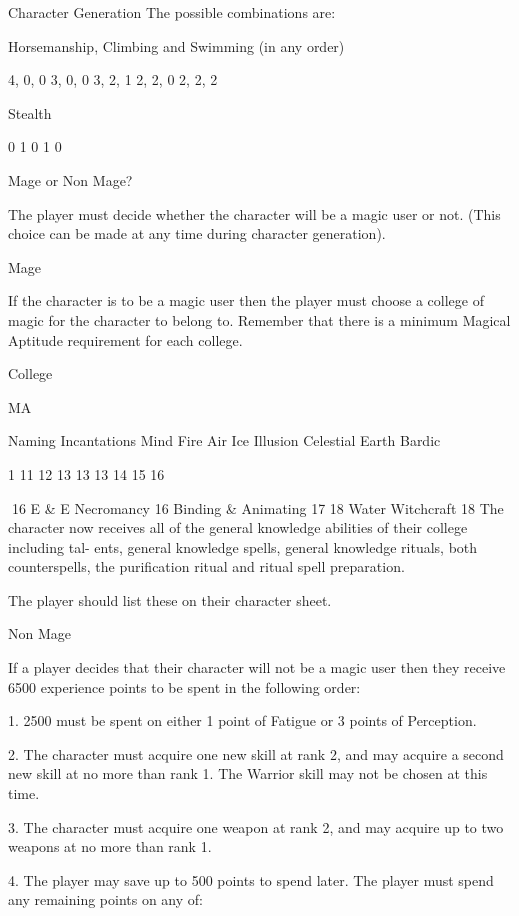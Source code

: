\begin{Chapter}{Character Generation}
The possible combinations are: 

Horsemanship, 
Climbing and 
Swimming  
(in any order) 

4, 0, 0 
3, 0, 0 
3, 2, 1 
2, 2, 0 
2, 2, 2 

Stealth 

0 
1 
0 
1 
0 

Mage or Non Mage? 

The  player  must  decide  whether  the character  will 
be a magic user or not. (This choice can be made at 
any time during character generation). 

Mage 

If  the  character  is  to  be  a  magic  user  then  the 
player  must  choose  a  college  of  magic  for  the 
character  to  belong  to.  Remember  that  there  is  a 
minimum  Magical  Aptitude  requirement  for  each 
college. 

College  

MA 

Naming Incantations  
Mind  
Fire  
Air  
Ice  
Illusion  
Celestial  
Earth  
Bardic  

1 
11 
12 
13 
13 
13 
14 
15 
16 

16 
E \& E  
Necromancy  
16 
Binding \& Animating   17 
18 
Water  
Witchcraft  
18 
The  character  now  receives  all  of  the  general 
knowledge  abilities  of  their  college  including  tal-
ents, general knowledge spells, general knowledge 
rituals,  both  counterspells,  the  purification  ritual 
and ritual spell preparation. 

The  player  should  list  these  on  their  character 
sheet. 

Non Mage 

If a player decides that their character will not be a 
magic  user  then  they  receive  6500  experience 
points to be spent in the following order: 

1. 2500 must be spent on either 1 point of Fatigue 
or 3 points of Perception. 

2. The character must acquire one new skill at rank 
2, and  may  acquire  a  second new  skill  at  no  more 
than rank 1. The Warrior skill may not be chosen at 
this time. 

3.  The  character  must acquire  one  weapon  at  rank 
2, and may acquire up to two weapons at no more 
than rank 1. 

4.  The  player  may  save  up  to  500  points  to  spend 
later.  The  player  must  spend  any  remaining points 
on any of:  


\end{Chapter}

